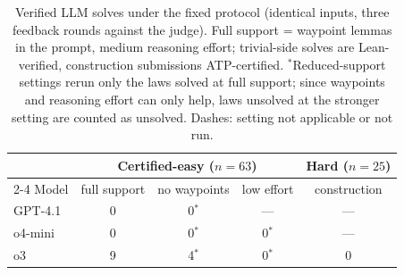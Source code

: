 \begin{table}[t]
\centering
\begin{tabular}{@{}lcccc@{}}
\toprule
 & \multicolumn{3}{c}{Certified-easy ($n=63$)} & Hard ($n=25$) \\
\cmidrule(lr){2-4}
Model & full support & no waypoints & low effort & construction \\
\midrule
GPT-4.1 & 0 & 0$^{*}$ & ---        & --- \\
o4-mini & 0 & 0$^{*}$ & 0$^{*}$    & --- \\
o3      & 9 & 4$^{*}$ & 0$^{*}$    & 0   \\
\bottomrule
\end{tabular}
\caption{Verified LLM solves under the fixed protocol (identical inputs,
three feedback rounds against the judge). Full support = waypoint lemmas in
the prompt, medium reasoning effort; trivial-side solves are Lean-verified,
construction submissions ATP-certified. $^{*}$Reduced-support settings rerun
only the laws solved at full support; since waypoints and reasoning effort
can only help, laws unsolved at the stronger setting are counted as
unsolved. Dashes: setting not applicable or not run.}
\label{tab:llm}
\end{table}
